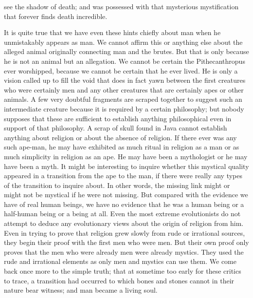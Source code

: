 see the shadow of death; and was possessed with that mysterious mystification that forever finds death incredible.

It is quite true that we have even these hints chiefly about man when he unmistakably appears as man. We cannot affirm this or anything else about the alleged animal originally connecting man and the brutes. But that is only because he is not an animal but an allegation. We cannot be certain the Pithecanthropus ever worshipped, because we cannot be certain that he ever lived. He is only a vision called up to fill the void that does in fact yawn between the first creatures who were certainly men and any other creatures that are certainly apes or other animals. A few very doubtful fragments are scraped together to suggest such an intermediate creature because it is required by a certain philosophy; but nobody supposes that these are sufficient to establish anything philosophical even in support of that philosophy. A scrap of skull found in Java cannot establish anything about religion or about the absence of religion. If there ever was any such ape-man, he may have exhibited as much ritual in religion as a man or as much simplicity in religion as an ape. He may have been a mythologist or he may have been a myth. It might be interesting to inquire whether this mystical quality appeared in a transition from the ape to the man, if there were really any types of the transition to inquire about. In other words, the missing link might or might not be mystical if he were not missing. But compared with the evidence we have of real human beings, we have no evidence that he was a human being or a half-human being or a being at all. Even the most extreme evolutionists do not attempt to deduce any evolutionary views about the origin of religion from him. Even in trying to prove that religion grew slowly from rude or irrational sources, they begin their proof with the first men who were men. But their own proof only proves that the men who were already men were already mystics. They used the rude and irrational elements as only men and mystics can use them. We come back once more to the simple truth; that at sometime too early for these critics to trace, a transition had occurred to which bones and stones cannot in their nature bear witness; and man became a living soul.


